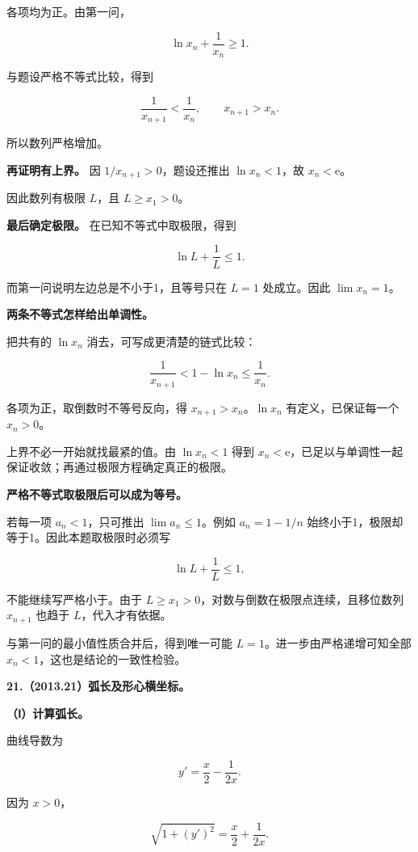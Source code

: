 \documentclass[UTF8,11pt,fontset=windows]{ctexart}
\begin{document}
各项均为正。由第一问，

$$
\ln x_n+\frac1{x_n}\ge1.
$$

与题设严格不等式比较，得到

$$
\frac1{x_{n+1}}<\frac1{x_n},
\qquad x_{n+1}>x_n.
$$

所以数列严格增加。

\textbf{再证明有上界。} 因 $1/x_{n+1}>0$，题设还推出 $\ln x_n<1$，故 $x_n<\mathrm e$。

因此数列有极限 $L$，且 $L\ge x_1>0$。

\textbf{最后确定极限。} 在已知不等式中取极限，得到

$$
\ln L+\frac1L\le1.
$$

而第一问说明左边总是不小于1，且等号只在 $L=1$ 处成立。因此 $\lim x_n=1$。

\textbf{两条不等式怎样给出单调性。}

把共有的 $\ln x_n$ 消去，可写成更清楚的链式比较：

$$
\frac1{x_{n+1}}<1-\ln x_n\le\frac1{x_n}.
$$

各项为正，取倒数时不等号反向，得 $x_{n+1}>x_n$。$\ln x_n$ 有定义，已保证每一个 $x_n>0$。

上界不必一开始就找最紧的值。由 $\ln x_n<1$ 得到 $x_n<\mathrm e$，已足以与单调性一起保证收敛；再通过极限方程确定真正的极限。

\textbf{严格不等式取极限后可以成为等号。}

若每一项 $a_n<1$，只可推出 $\lim a_n\le1$。例如 $a_n=1-1/n$ 始终小于1，极限却等于1。因此本题取极限时必须写

$$
\ln L+\frac1L\le1,
$$

不能继续写严格小于。由于 $L\ge x_1>0$，对数与倒数在极限点连续，且移位数列 $x_{n+1}$ 也趋于 $L$，代入才有依据。

与第一问的最小值性质合并后，得到唯一可能 $L=1$。进一步由严格递增可知全部 $x_n<1$，这也是结论的一致性检验。

\clearpage

\textbf{21.（2013.21）弧长及形心横坐标。}

\textbf{（Ⅰ）计算弧长。}

曲线导数为

$$
y'=\frac x2-\frac1{2x}.
$$

因为 $x>0$，

$$
\sqrt{1+(y')^2}=\frac x2+\frac1{2x}.
$$
\end{document}
